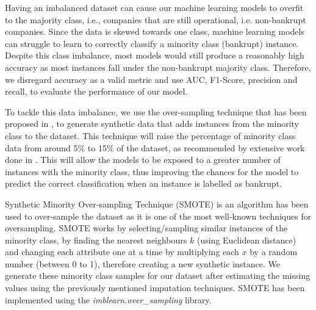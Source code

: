 Having an imbalanced dataset can cause our machine learning models to overfit to the majority class, i.e., companies that are still operational, i.e. non-bankrupt companies. Since the data is skewed towards one class, machine learning models can struggle to learn to correctly classify a minority class (bankrupt) instance. 
Despite this class imbalance, most models would still produce a reasonably high accuracy as most instances fall under the non-bankrupt majority class. Therefore, we disregard accuracy as a valid metric and use AUC, F1-Score, precision and recall, to evaluate the performance of our model.

To tackle this data imbalance, we use the over-sampling technique that has been proposed in \cite{le2018cluster}, to generate synthetic data that adds instances from the minority class to the dataset. This technique will raise the percentage of minority class data from around 5\% to 15\% of the dataset, as recommended by extensive work done in \cite{cao2013integrated}. This will allow the models to be exposed to a greater number of instances with the minority class, thus improving the chances for the model to predict the correct classification when an instance is labelled as bankrupt.


Synthetic Minority Over-sampling Technique (SMOTE) is an algorithm has been used to over-sample the dataset as it is one of the most well-known techniques for oversampling. SMOTE \cite{chawla2002smote} works by selecting/sampling similar instances of the minority class, by finding the nearest neighbours $k$ (using Euclidean distance) and changing each attribute one at a time by multiplying each $x$ by a random number (between 0 to 1), therefore creating a new synthetic instance. We generate these minority class samples for our dataset after estimating the missing values using the previously mentioned imputation techniques. SMOTE has been implemented using the \textit{imblearn.over\_sampling} library.


